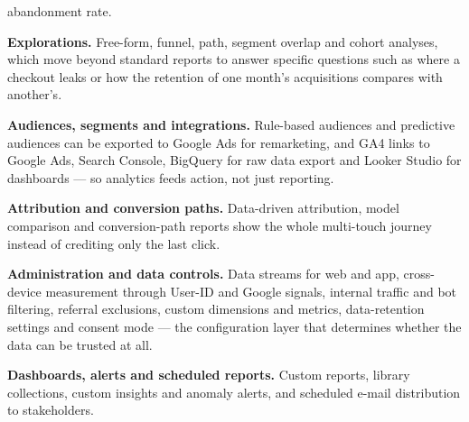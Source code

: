 \begin{qlist}
\begin{apts}
      abandonment rate.
\item \textbf{Explorations.} Free-form, funnel, path, segment overlap and
      cohort analyses, which move beyond standard reports to answer specific
      questions such as where a checkout leaks or how the retention of one
      month's acquisitions compares with another's.
\item \textbf{Audiences, segments and integrations.} Rule-based audiences and
      predictive audiences can be exported to Google Ads for remarketing, and
      GA4 links to Google Ads, Search Console, BigQuery for raw data export and
      Looker Studio for dashboards --- so analytics feeds action, not just
      reporting.
\item \textbf{Attribution and conversion paths.} Data-driven attribution,
      model comparison and conversion-path reports show the whole multi-touch
      journey instead of crediting only the last click.
\item \textbf{Administration and data controls.} Data streams for web and app,
      cross-device measurement through User-ID and Google signals, internal
      traffic and bot filtering, referral exclusions, custom dimensions and
      metrics, data-retention settings and consent mode --- the configuration
      layer that determines whether the data can be trusted at all.
\item \textbf{Dashboards, alerts and scheduled reports.} Custom reports,
      library collections, custom insights and anomaly alerts, and scheduled
      e-mail distribution to stakeholders.
\end{apts}


\end{qlist}
